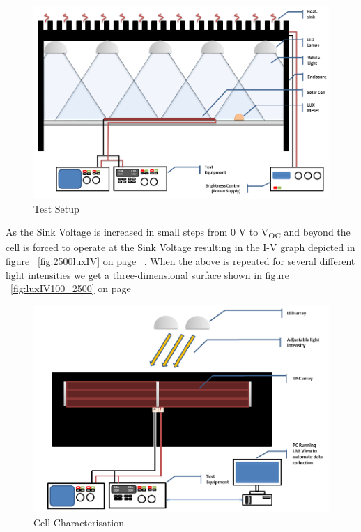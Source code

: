  \begin{figure}[H]
  \begin{center}
  \includegraphics[width=\textwidth]{images/Light_Box}
  \caption{Test Setup }
  \label{fig:test setup}
  \end{center}
  \end{figure}
As the Sink Voltage is increased in small steps from 0 V to V\textsubscript{OC} and beyond the cell is forced to operate at the Sink Voltage resulting in the I-V graph depicted in figure ~\ref{fig:2500luxIV} on page ~\pageref{fig:2500luxIV}.
When the above is repeated for several different light intensities we get a three-dimensional surface shown in figure ~\ref{fig:luxIV100_2500} on page ~\pageref{fig:luxIV100_2500}\\

 \begin{figure}[H]
  \begin{center}
  \includegraphics[width=\textwidth]{images/Cell_under_test}
  \caption{Cell Characterisation }
  \label{fig:Cell_U_test}
  \end{center}
  \end{figure}

